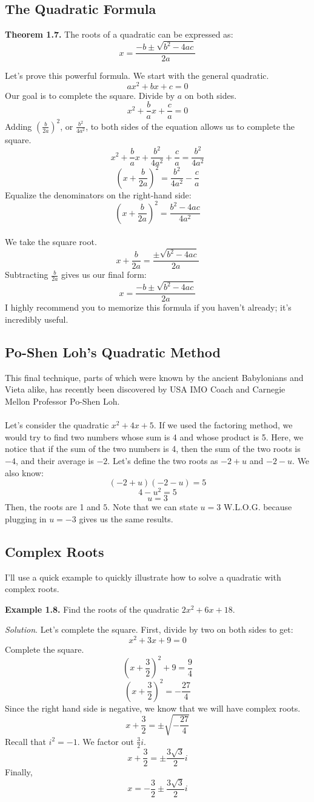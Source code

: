 \documentclass{article}
\begin{document}
\subsection{The Quadratic Formula}
\begin{mdframed}
  \textbf{Theorem 1.7.} The roots of a quadratic can be expressed as: $$x=\frac{-b\pm\sqrt{b^2-4ac}}{2a}$$
\end{mdframed}
Let's prove this powerful formula. We start with the general quadratic. $$ax^2+bx+c=0$$
Our goal is to complete the square. Divide by $a$ on both sides.
$$x^2+\frac{b}{a}x+\frac{c}{a}=0$$
Adding $(\frac{b}{2a})^2$, or $\frac{b^2}{4a^2}$, to both sides of the equation allows us to complete the square.
$$x^2+\frac{b}{a}x+\frac{b^2}{4a^2}+\frac{c}{a}=\frac{b^2}{4a^2}$$
$$(x+\frac{b}{2a})^2=\frac{b^2}{4a^2}-\frac{c}{a}$$
Equalize the denominators on the right-hand side:
$$(x+\frac{b}{2a})^2=\frac{b^2-4ac}{4a^2}$$\\
We take the square root.
$$x+\frac{b}{2a}=\frac{\pm\sqrt{b^2-4ac}}{2a}$$
Subtracting $\frac{b}{2a}$ gives us our final form:
$$x=\frac{-b\pm\sqrt{b^2-4ac}}{2a}$$
I highly recommend you to memorize this formula if you haven't already; it's incredibly useful.

\subsection{Po-Shen Loh's Quadratic Method}
This final technique, parts of which were known by the ancient Babylonians and Vieta alike, has recently been discovered by USA IMO Coach and Carnegie Mellon Professor Po-Shen Loh.
\\\\Let's consider the quadratic $x^2+4x+5$. If we used the factoring method, we would try to find two numbers whose sum is 4 and whose product is 5. Here, we notice that if the sum of the two numbers is 4, then the sum of the two roots is $-4$, and their average is $-2$. Let's define the two roots as $-2+u$ and $-2-u$. We also know:
$$(-2+u)(-2-u)=5$$
$$4-u^2=5$$
$$u=3$$
Then, the roots are 1 and $5$. Note that we can state $u=3$ W.L.O.G. because plugging in $u=-3$ gives us the same results.

\subsection{Complex Roots}
I'll use a quick example to quickly illustrate how to solve a quadratic with complex roots.
\begin{mdframed}
  \textbf{Example 1.8.} Find the roots of the quadratic $2x^2+6x+18$.
\end{mdframed}
\textit{Solution}. Let's complete the square. First, divide by two on both sides to get: $$x^2+3x+9=0$$
Complete the square.
$$(x+\frac{3}{2})^2+9=\frac{9}{4}$$
$$(x+\frac{3}{2})^2=-\frac{27}{4}$$
Since the right hand side is negative, we know that we will have complex roots.
$$x+\frac{3}{2}=\pm\sqrt{-\frac{27}{4}}$$
Recall that $i^2=-1$. We factor out $\frac{3}{2}i$.
$$x+\frac{3}{2}=\pm\frac{3\sqrt{3}}{2}i$$
Finally,
$$x=-\frac{3}{2}\pm\frac{3\sqrt{3}}{2}i$$
\end{document}
